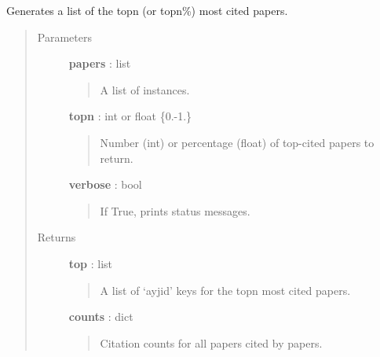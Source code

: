 \documentclass[letterpaper,10pt,english]{sphinxmanual}
\begin{document}
\begin{fulllineitems}
\label{tethne.networks:tethne.networks.helpers.top_cited}
Generates a list of the topn (or topn\%) most cited papers.
\begin{quote}\begin{description}
\item[{Parameters }] \leavevmode
\textbf{papers} : list
\begin{quote}

A list of {\hyperref[tethne:tethne.data.Paper]{}} instances.
\end{quote}

\textbf{topn} : int or float \{0.-1.\}
\begin{quote}

Number (int) or percentage (float) of top-cited papers to return.
\end{quote}

\textbf{verbose} : bool
\begin{quote}

If True, prints status messages.
\end{quote}

\item[{Returns }] \leavevmode
\textbf{top} : list
\begin{quote}

A list of `ayjid' keys for the topn most cited papers.
\end{quote}

\textbf{counts} : dict
\begin{quote}

Citation counts for all papers cited by papers.
\end{quote}

\end{description}\end{quote}

\end{fulllineitems}

\end{document}
